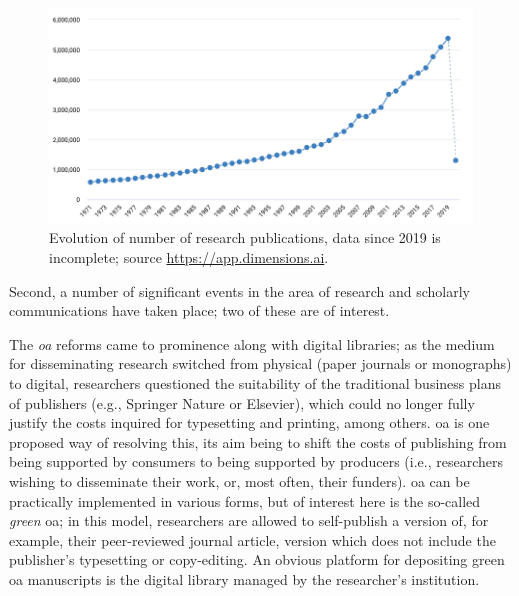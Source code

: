 \begin{figure}[ht!]
\centering
  \includegraphics[width=1\linewidth]{figures/publications.png}  
  \caption{Evolution of number of research publications, data since 2019 is incomplete; source \url{https://app.dimensions.ai}.}
  \label{fig:nopublications}
\end{figure}

Second, a number of significant events in the area of research and scholarly communications have taken place; two of these are of interest.

The \emph{\gls{oa}} reforms came to prominence along with digital libraries; as the medium for disseminating research switched from physical (paper journals or monographs) to digital, researchers questioned the suitability of the traditional business plans of publishers (e.g., Springer Nature or Elsevier), which could no longer fully justify the costs inquired for typesetting and printing, among others. \gls{oa} is one proposed way of resolving this, its aim being to shift the costs of publishing from being supported by consumers to being supported by producers (i.e., researchers wishing to disseminate their work, or, most often, their funders). \gls{oa} can be practically implemented in various forms, but of interest here is the so-called \emph{green} \gls{oa}; in this model, researchers are allowed to self-publish a version of, for example, their peer-reviewed journal article, version which does not include the publisher's typesetting or copy-editing. An obvious platform for depositing green \gls{oa} manuscripts is the digital library managed by the researcher's institution.

